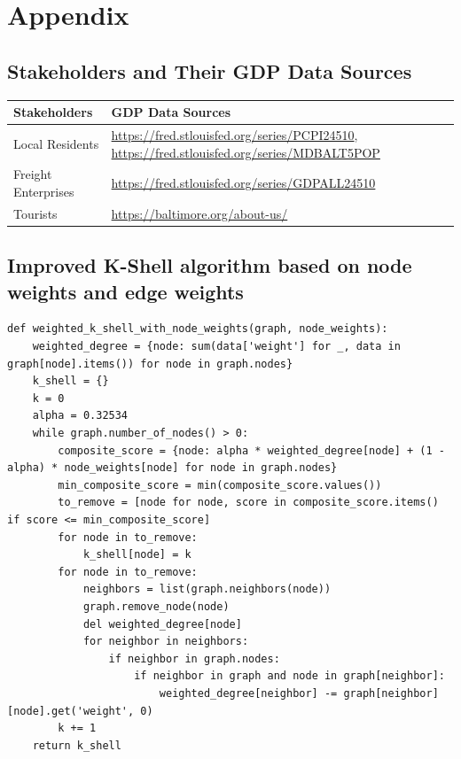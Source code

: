 \documentclass{mcmthesis}
\begin{document}
% 



\newpage
{} 


\section{Appendix}

\subsection{Stakeholders and Their GDP Data Sources}
\label{sec:source}
\begin{table}[H]
  \centering
  \begin{tabularx}{\textwidth}{lX}
      \toprule
      Stakeholders & GDP Data Sources \\
      \midrule
      Local Residents & \url{https://fred.stlouisfed.org/series/PCPI24510}, \url{https://fred.stlouisfed.org/series/MDBALT5POP} \\
      Freight Enterprises & \url{https://fred.stlouisfed.org/series/GDPALL24510} \\
      Tourists & \url{https://baltimore.org/about-us/} \\
      \bottomrule
  \end{tabularx}
\end{table}

\subsection{Improved K-Shell algorithm based on node weights and edge weights}

\begin{lstlisting}
def weighted_k_shell_with_node_weights(graph, node_weights):
    weighted_degree = {node: sum(data['weight'] for _, data in graph[node].items()) for node in graph.nodes}
    k_shell = {}
    k = 0
    alpha = 0.32534
    while graph.number_of_nodes() > 0:
        composite_score = {node: alpha * weighted_degree[node] + (1 - alpha) * node_weights[node] for node in graph.nodes}
        min_composite_score = min(composite_score.values())
        to_remove = [node for node, score in composite_score.items() if score <= min_composite_score]
        for node in to_remove:
            k_shell[node] = k
        for node in to_remove:
            neighbors = list(graph.neighbors(node))
            graph.remove_node(node)
            del weighted_degree[node]
            for neighbor in neighbors:
                if neighbor in graph.nodes:
                    if neighbor in graph and node in graph[neighbor]:
                        weighted_degree[neighbor] -= graph[neighbor][node].get('weight', 0)
        k += 1
    return k_shell
\end{lstlisting}
\end{document}
